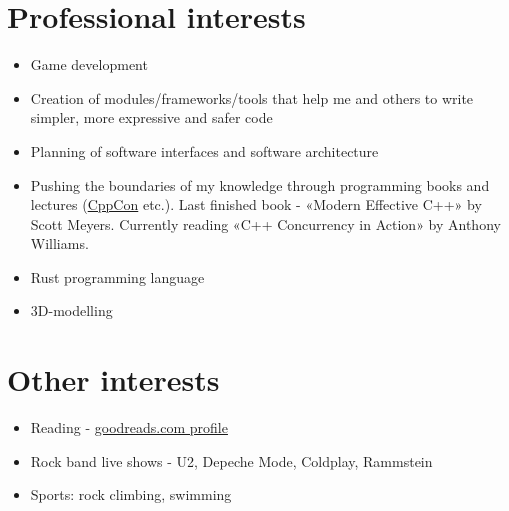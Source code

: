 \documentclass[a4paper, 11pt]{article}
\begin{document}
\section{Professional interests}
\begin{itemize}
    \item   Game development
    \item   Creation of modules/frameworks/tools that help me and others
            to write simpler, more expressive and safer code
    \item   Planning of software interfaces and software architecture
    \item   Pushing the boundaries of my knowledge through programming books
            and lectures (\href{http://cppcon.org/}{CppCon} etc.). Last finished book - «Modern
            Effective C++» by Scott Meyers. Currently reading «C++ Concurrency in
            Action» by Anthony Williams.
    \item   Rust programming language
    \item   3D-modelling
\end{itemize}

\section{Other interests}
\begin{itemize}
    \item   Reading -
            \href{https://www.goodreads.com/user/show/29629010-sergey-nikitin}{goodreads.com profile}
    \item   Rock band live shows - U2, Depeche Mode, Coldplay, Rammstein
    \item   Sports: rock climbing, swimming
\end{itemize}
\end{document}
